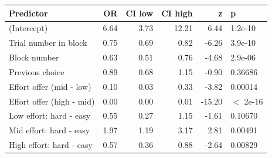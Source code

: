 \begin{table}[ht]
\centering
\begin{tabular}{lrrrrl}
  \hline
Predictor & OR & CI low & CI high & z & p \\ 
  \hline
(Intercept) & 6.64 & 3.73 & 12.21 & 6.44 & 1.2e-10 \\ 
  Trial number in block & 0.75 & 0.69 & 0.82 & -6.26 & 3.9e-10 \\ 
  Block number & 0.63 & 0.51 & 0.76 & -4.68 & 2.9e-06 \\ 
  Previous choice & 0.89 & 0.68 & 1.15 & -0.90 & 0.36686 \\ 
  Effort offer (mid - low) & 0.10 & 0.03 & 0.33 & -3.82 & 0.00014 \\ 
  Effort offer (high - mid) & 0.00 & 0.00 & 0.01 & -15.20 & $<$ 2e-16 \\ 
  Low effort: hard - easy & 0.55 & 0.27 & 1.15 & -1.61 & 0.10670 \\ 
  Mid effort: hard - easy & 1.97 & 1.19 & 3.17 & 2.81 & 0.00491 \\ 
  High effort: hard - easy & 0.57 & 0.36 & 0.88 & -2.64 & 0.00829 \\ 
   \hline
\end{tabular}
\end{table}

